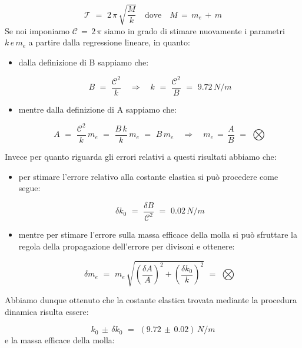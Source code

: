\begin{equation}
	\mathcal{T} \,\,=\,\, 2 \, \pi \, \sqrt{\frac{M}{k}} \quad \text{dove} \quad M \,=\, m_e\,+\,m
\end{equation}
%
Se noi imponiamo $\mathcal{C} \,=\, 2\,\pi$ siamo in grado di stimare nuovamente i parametri $k \,e\, m_e$ a partire dalla regressione lineare, in quanto:
\begin{itemize}
	\item{dalla definizione di B sappiamo che:
	
			\begin{equation*}
				B \,\,=\,\, \frac{\mathcal{C}^2}{k} \quad \Longrightarrow \quad k \,\,=\,\, \frac{\mathcal{C}^2}{B} \,\,=\,\, 9.72 \, N/m
			\end{equation*}}
	\item{mentre dalla definizione di A sappiamo che:
	
			\begin{equation*}
				A \,\,=\,\, \frac{\mathcal{C}^2}{k} \, m_e \,\, = \,\, \frac{B\,k}{k} \, m_e \,\, = \,\, B\,m_e \quad \Longrightarrow \quad m_e \,=\, \frac{A}{B} \,\,=\,\, \bigotimes
			\end{equation*}}
\end{itemize}
Invece per quanto riguarda gli errori relativi a questi risultati abbiamo che:
\begin{itemize}
	\item{per stimare l'errore relativo alla costante elastica si può procedere come segue:
	
			\begin{equation*}
				\delta k_0 \,\,=\,\, \frac{\delta B}{\mathcal{C}^2} \,\,=\,\, 0.02 \, N/m
			\end{equation*}
			}
	\item{mentre per stimare l'errore sulla massa efficace della molla si può sfruttare la regola della propagazione dell'errore per divisoni e ottenere:
	
			\begin{equation*}
				\delta m_e \,\,=\,\, m_e \, \sqrt{(\frac{\delta A}{A})^2 + (\frac{\delta k_0}{k})^2} \,\,=\,\, \bigotimes
			\end{equation*}
			}
\end{itemize}
Abbiamo dunque ottenuto che la costante elastica trovata mediante la procedura dinamica risulta essere:

\begin{equation*}
	k_0 \, \pm \, \delta k_0 \,\,=\,\, (9.72 \, \pm \, 0.02) \, N/m
\end{equation*}
%
e la massa efficace della molla:


